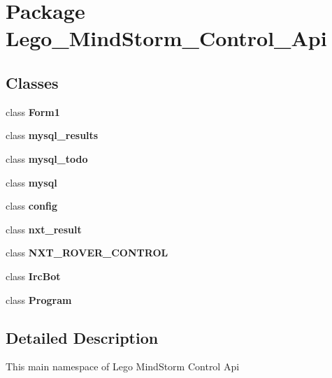 \section{Package Lego\_\-MindStorm\_\-Control\_\-Api}
\label{namespace_lego___mind_storm___control___api}
\subsection*{Classes}
\begin{CompactItemize}
\item 
class {\bf Form1}
\item 
class {\bf mysql\_\-results}
\item 
class {\bf mysql\_\-todo}
\item 
class {\bf mysql}
\item 
class {\bf config}
\item 
class {\bf nxt\_\-result}
\item 
class {\bf NXT\_\-ROVER\_\-CONTROL}
\item 
class {\bf IrcBot}
\item 
class \textbf{Program}
\end{CompactItemize}


\subsection{Detailed Description}
This main namespace of Lego MindStorm Control Api 

